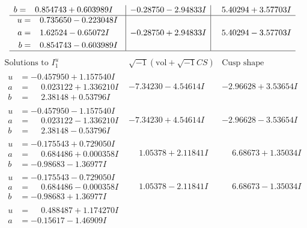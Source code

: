 \documentclass[1p]{elsarticle_modified}
\theoremstyle{definition}
\newcommand{\I}{\sqrt{-1}}
\begin{document}
$$\begin{array}{c|c|c}
\begin{aligned}
b &= \phantom{-}0.854743 + 0.603989 I\end{aligned}
 & -0.28750 - 2.94833 I & \phantom{-}5.40294 + 3.57703 I \\ \hline\begin{aligned}
u &= \phantom{-}0.735650 - 0.223048 I \\
a &= \phantom{-}1.62524 - 0.65072 I \\
b &= \phantom{-}0.854743 - 0.603989 I\end{aligned}
 & -0.28750 + 2.94833 I & \phantom{-}5.40294 - 3.57703 I\\
 \hline 
 \end{array}$$\newpage$$\begin{array}{c|c|c}  
\text{Solutions to }I^u_{1}& \I (\text{vol} + \sqrt{-1}CS) & \text{Cusp shape}\\
 \hline 
\begin{aligned}
u &= -0.457950 + 1.157540 I \\
a &= \phantom{-}0.023122 + 1.336210 I \\
b &= \phantom{-}2.38148 + 0.53796 I\end{aligned}
 & -7.34230 - 4.54614 I & -2.96628 + 3.53654 I \\ \hline\begin{aligned}
u &= -0.457950 - 1.157540 I \\
a &= \phantom{-}0.023122 - 1.336210 I \\
b &= \phantom{-}2.38148 - 0.53796 I\end{aligned}
 & -7.34230 + 4.54614 I & -2.96628 - 3.53654 I \\ \hline\begin{aligned}
u &= -0.175543 + 0.729050 I \\
a &= \phantom{-}0.684486 + 0.000358 I \\
b &= -0.98683 - 1.36977 I\end{aligned}
 & \phantom{-}1.05378 + 2.11841 I & \phantom{-}6.68673 + 1.35034 I \\ \hline\begin{aligned}
u &= -0.175543 - 0.729050 I \\
a &= \phantom{-}0.684486 - 0.000358 I \\
b &= -0.98683 + 1.36977 I\end{aligned}
 & \phantom{-}1.05378 - 2.11841 I & \phantom{-}6.68673 - 1.35034 I \\ \hline\begin{aligned}
u &= \phantom{-}0.488487 + 1.174270 I \\
a &= -0.15617 - 1.46909 I \\

\end{aligned}
\end{array}$$
\end{document}
